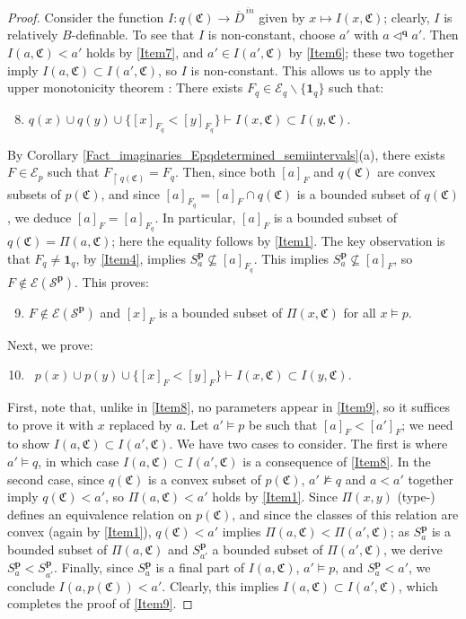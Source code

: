 \documentclass{amsart}
\theoremstyle{definition}
\theoremstyle{definition}
\def\strok{\restriction}
\newcommand{\Mon}{\mathfrak C}
\begin{document}
\begin{proof}
\smallskip
Consider the function $I:q(\Mon)\to \overline D^{\,in}$ given by $x\mapsto I(x,\Mon)$; clearly, $I$ is relatively $B$-definable.  To see that $I$ is non-constant, choose $a'$ with $a\triangleleft^\mathbf qa'$. Then $I(a,\Mon)<a'$ holds by \ref{Item7}, and $a'\in I(a',\Mon)$ by \ref{Item6}; these two together imply $I(a,\Mon)\subset I(a',\Mon)$, so $I$ is non-constant. This allows us to apply the upper monotonicity theorem \cite[Theorem 3.6]{MTwom}: There exists  $F_q\in\mathcal E_q\smallsetminus\{\mathbf 1_q\}$ such that:
\begin{enumerate}[(1)]
\setcounter{enumi}{7}
\item\label{Item8} $q(x)\cup q(y)\cup \{[x]_{F_q}<[y]_{F_q}\}\vdash I(x,\Mon)\subset I(y,\Mon).$
\end{enumerate}
By Corollary \ref{Fact_imaginaries_Epqdetermined_semiintervals}(a), there exists $F\in\mathcal E_p$ such that $F_{\strok q(\Mon)}=F_q$. Then, since both $[a]_F$ and $q(\Mon)$ are convex subsets of $p(\Mon)$, and since $[a]_{F_q}=[a]_F\cap q(\Mon)$ is a bounded subset of $q(\Mon)$, we deduce $[a]_{F}=[a]_{F_q}$. In particular, $[a]_F$ is a bounded subset of $q(\Mon)=\Pi(a,\Mon)$; here the equality follows by \ref{Item1}. The key observation is that $F_q\neq \mathbf 1_q$, by \ref{Item4}, implies $S^{\mathbf p}_a\not\subseteq [a]_{F_q}$. This implies $S^{\mathbf p}_a\not\subseteq [a]_{F}$, so $F\notin \mathcal E(\mathcal S^{\mathbf p})$. This proves: 
\begin{enumerate}[(1)]
\setcounter{enumi}{8}
\item\label{Item8'} $F\notin \mathcal E(\mathcal S^{\mathbf p})$ and $[x]_F$ is a bounded subset of $\Pi(x,\Mon)$ for all $x\models p$. 
\end{enumerate}
Next, we prove:
\begin{enumerate}[(1)]
\setcounter{enumi}{9}
\item\label{Item9}  \ $p(x)\cup p(y)\cup \{[x]_{F}<[y]_{F}\}\vdash I(x,\Mon)\subset I(y,\Mon).$
\end{enumerate}
First, note that, unlike in \ref{Item8}, no parameters appear in \ref{Item9}, so it suffices to prove it with $x$ replaced by $a$. Let $a'\models p$ be such that $[a]_{F}<[a']_{F}$; we need to show $I(a,\Mon)\subset I(a',\Mon)$. We have two cases to consider. The first is where $a'\models q$, in which case $I(a,\Mon)\subset I(a',\Mon)$ is a consequence of \ref{Item8}. In the second case, since $q(\Mon)$ is a convex subset of $p(\Mon)$, $a'\not\models q$ and $a<a'$ together imply $q(\Mon)<a'$, so $\Pi(a,\Mon)<a'$ holds by \ref{Item1}. Since $\Pi(x,y)$ (type-) defines an equivalence relation on $p(\Mon)$, and since the classes of this relation are convex (again by \ref{Item1}), $q(\Mon)<a'$ implies $\Pi(a,\Mon)<\Pi(a',\Mon)$; as $S^{\mathbf p}_a$ is a bounded subset of $\Pi(a,\Mon)$ and $S^{\mathbf p}_{a'}$ a bounded subset of $\Pi(a',\Mon)$, we derive $S^{\mathbf p}_{a}<S^{\mathbf p}_{a'}$. Finally, since $S^{\mathbf p}_{a}$ is a final part of $I(a,\Mon)$, $a'\models p$, and $S^{\mathbf p}_{a}<a'$, we conclude $I(a,p(\Mon))<a'$. Clearly, this implies $I(a,\Mon)\subset I(a',\Mon)$, which completes the proof of \ref{Item9}.  



\end{proof}
\end{document}
